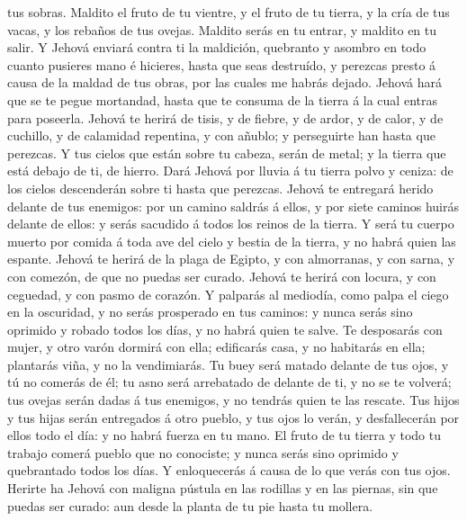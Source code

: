 tus sobras.  Maldito el fruto de tu vientre, y el fruto
de tu tierra, y la cría de tus vacas, y los rebaños de tus ovejas.
 Maldito serás en tu entrar, y maldito en tu salir.
 Y Jehová enviará contra ti la maldición, quebranto y
asombro en todo cuanto pusieres mano é hicieres, hasta que seas
destruído, y perezcas presto á causa de la maldad de tus obras, por las
cuales me habrás dejado.  Jehová hará que se te pegue
mortandad, hasta que te consuma de la tierra á la cual entras para
poseerla.  Jehová te herirá de tisis, y de fiebre, y de
ardor, y de calor, y de cuchillo, y de calamidad repentina, y con
añublo; y perseguirte han hasta que perezcas.  Y tus
cielos que están sobre tu cabeza, serán de metal; y la tierra que está
debajo de ti, de hierro.  Dará Jehová por lluvia á tu
tierra polvo y ceniza: de los cielos descenderán sobre ti hasta que
perezcas.  Jehová te entregará herido delante de tus
enemigos: por un camino saldrás á ellos, y por siete caminos huirás
delante de ellos: y serás sacudido á todos los reinos de la tierra.
 Y será tu cuerpo muerto por comida á toda ave del cielo
y bestia de la tierra, y no habrá quien las espante. 
Jehová te herirá de la plaga de Egipto, y con almorranas, y con sarna, y
con comezón, de que no puedas ser curado.  Jehová te
herirá con locura, y con ceguedad, y con pasmo de corazón.
 Y palparás al mediodía, como palpa el ciego en la
oscuridad, y no serás prosperado en tus caminos: y nunca serás sino
oprimido y robado todos los días, y no habrá quien te salve.
 Te desposarás con mujer, y otro varón dormirá con ella;
edificarás casa, y no habitarás en ella; plantarás viña, y no la
vendimiarás.  Tu buey será matado delante de tus ojos, y
tú no comerás de él; tu asno será arrebatado de delante de ti, y no se
te volverá; tus ovejas serán dadas á tus enemigos, y no tendrás quien te
las rescate.  Tus hijos y tus hijas serán entregados á
otro pueblo, y tus ojos lo verán, y desfallecerán por ellos todo el día:
y no habrá fuerza en tu mano.  El fruto de tu tierra y
todo tu trabajo comerá pueblo que no conociste; y nunca serás sino
oprimido y quebrantado todos los días.  Y enloquecerás á
causa de lo que verás con tus ojos.  Herirte ha Jehová
con maligna pústula en las rodillas y en las piernas, sin que puedas ser
curado: aun desde la planta de tu pie hasta tu mollera. 
